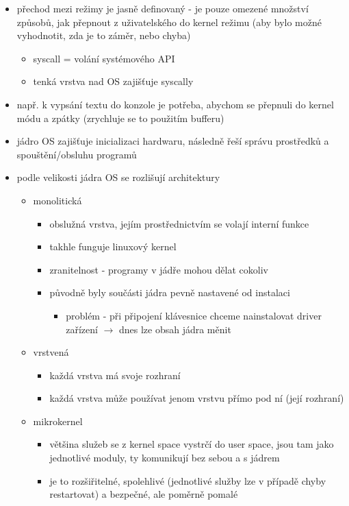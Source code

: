 \begin{itemize}
\begin{itemize}
\begin{itemize}
\item má plný přístup ke zdrojům
\end{itemize}
\item přechod mezi režimy je jasně definovaný - je pouze omezené množství způsobů, jak přepnout z uživatelského do kernel režimu (aby bylo možné vyhodnotit, zda je to záměr, nebo chyba)
\begin{itemize}
\item syscall = volání systémového API
\item tenká vrstva nad OS zajišťuje syscally
\end{itemize}
\item např. k vypsání textu do konzole je potřeba, abychom se přepnuli do kernel módu a zpátky (zrychluje se to použitím bufferu)
\item jádro OS zajišťuje inicializaci hardwaru, následně řeší správu prostředků a spouštění/obsluhu programů
\item podle velikosti jádra OS se rozlišují architektury
\begin{itemize}
\item monolitická
\begin{itemize}
\item obslužná vrstva, jejím prostřednictvím se volají interní funkce
\item takhle funguje linuxový kernel
\item zranitelnost - programy v jádře mohou dělat cokoliv
\item původně byly součásti jádra pevně nastavené od instalaci
\begin{itemize}
\item problém - při připojení klávesnice chceme nainstalovat driver zařízení $\to$ dnes lze obsah jádra měnit
\end{itemize}
\end{itemize}
\item vrstvená
\begin{itemize}
\item každá vrstva má svoje rozhraní
\item každá vrstva může používat jenom vrstvu přímo pod ní (její rozhraní)
\end{itemize}
\item mikrokernel
\begin{itemize}
\item většina služeb se z kernel space vystrčí do user space, jsou tam jako jednotlivé moduly, ty komunikují bez sebou a s jádrem
\item je to rozšiřitelné, spolehlivé (jednotlivé služby lze v případě chyby restartovat) a bezpečné, ale poměrně pomalé

\end{itemize}
\end{itemize}
\end{itemize}
\end{itemize}
